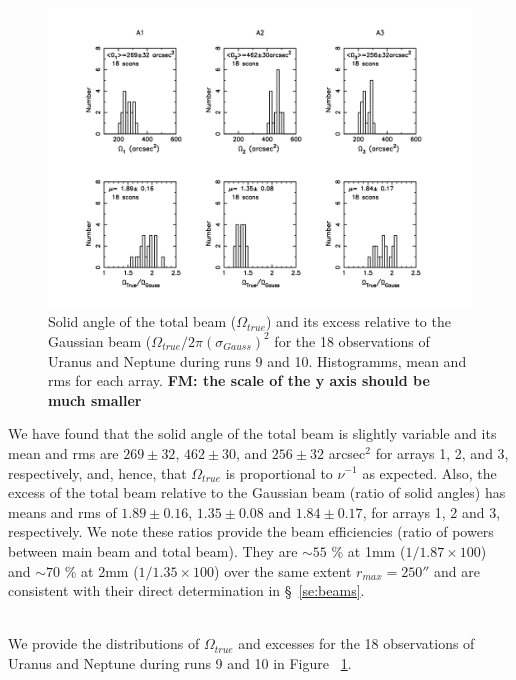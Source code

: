 \begin{figure}[th]
\begin{center}
  \includegraphics[clip, angle=0, scale=0.6]{Figures/Hist_omega_true_and_excess.pdf}
  \caption{Solid angle of the total beam ($\Omega_{true}$) and its excess relative to the Gaussian beam
   ($\Omega_{true} / 2 \pi (\sigma_{Gauss})^2$ for the 18 observations of Uranus and Neptune during runs 9 and 10.
   Histogramms, mean and rms for each array. {\bf FM: the scale of the y axis should be much smaller}}
\label{fig:Otrue}
\end{center}
\end{figure}

We have found that the solid angle of the total beam is slightly variable and its mean and rms are
$269\pm32$, $462\pm30$, and $256\pm32$ arcsec$^2$ for arrays 1, 2, and 3, respectively, and, hence,
that $\Omega_{true}$ is proportional to $\nu^{-1}$ as expected. Also, the excess of the total beam
relative to the Gaussian beam (ratio of solid angles) has means and rms
of $1.89\pm0.16$, $1.35\pm0.08$ and $1.84\pm0.17$, for arrays 1, 2 and 3, respectively.
We note these ratios provide
the beam efficiencies (ratio of powers between main beam  and total beam). They
are $\sim 55$ \% at 1mm ($1/1.87 \times 100$) and $\sim 70$ \% at 2mm ($1/1.35 \times 100$)
over the same extent $r_{max}=250''$ and are consistent with their direct determination in \S~\ref{se:beams}.
 
\\ 
 
 
 We provide the  distributions of $\Omega_{true}$ and excesses for
 the 18 observations of Uranus and Neptune during runs 9 and 10 in Figure ~\ref{fig:Otrue}. 


